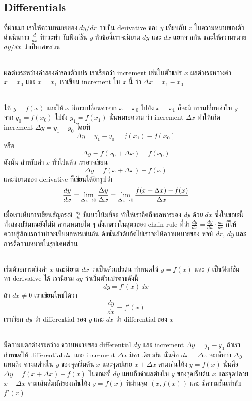 \documentclass[
]{book}
\theoremstyle{definition}
\theoremstyle{definition}
\theoremstyle{definition}
\theoremstyle{definition}
\theoremstyle{remark}
\begin{document}
\subsection{Differentials}\label{differentials}

ที่ผ่านมา เราให้ความหมายของ \(dy/dx\) ว่าเป็น derivative ของ \(y\) เทียบกับ \(x\)
ในความหมายของตัวดำเนินการ \(\frac{d}{dx}\) ที่กระทำ กับฟังก์ชัน \(y\) หัวข้อนี้เราจะนิยาม
\(dy\) และ \(dx\) แยกจากกัน และให้ความหมาย \(dy/dx\) ว่าเป็นเศษส่วน\\
\strut \\
ผลต่างระหว่างค่าสองค่าของตัวแปร เราเรียกว่า increment เช่นในตัวแปร \(x\)
ผลต่างระหว่างค่า \(x=x_0\) และ \(x=x_1\) เราเขียน increment ใน \(x\) นี้ ว่า
\(\Delta x = x_1-x_0\)\\
\strut \\
ให้ \(y=f(x)\) และให้ \(x\) มีการเปลี่ยนค่าจาก \(x=x_0\) ไปยัง \(x=x_1\) ก็จะมี
การเปลี่ยนค่าใน \(y\) จาก \(y_0 = f(x_0)\) ไปยัง \(y_1= f(x_1)\) นั่นหมายความ ว่า
increment \(\Delta x\) ทำให้เกิด increment \(\Delta y = y_1-y_0\) โดยที่
\[\Delta y = y_1-y_0 = f(x_1) - f(x_0)\] หรือ
\[\Delta y = f(x_0+\Delta x) - f(x_0)\] ดังนั้น สำหรับค่า \(x\) ทั่วไปแล้ว
เราอาจเขียน \[\Delta y = f(x+ \Delta x) - f(x)\] และนิยามของ derivative
ก็เขียนได้อีกรูปว่า
\[\frac{dy}{dx} = \lim_{\Delta x \to 0} \frac{\Delta y}{\Delta x} \\
    = \lim_{\Delta x \to 0} \frac{f(x+\Delta x) - f(x)}{\Delta x}\]

เมื่อเราเห็นการเขียนสัญกรณ์ \(\displaystyle \frac{dy}{dx}\) มีแนวโน้มที่จะ
ทำให้เราคิดถึงผลหารของ \(dy\) ด้วย \(dx\) ซึ่งในขณะนี้ ทั้งสองปริมาณยังไม่มี ความหมายใด ๆ
สังเกตว่าในสูตรของ chain rule ที่ว่า
\(\displaystyle \frac{dy}{dx} = \frac{dy}{du} \cdot \frac{du}{dx}\) ก็ให้
ความรู้สึกแรกว่าน่าจะเป็นผลหารเช่นกัน ดังนั้นลำดับถัดไปเราจะให้ความหมายของ พจน์ \(dx\),
\(dy\) และการตีความหมายในรูปเศษส่วน\\
\strut \\
เริ่มด้วยการตรึงค่า \(x\) และนิยาม \(dx\) ว่าเป็นตัวแปรต้น กำหนดให้ \(y = f(x)\) และ \(f\)
เป็นฟังก์ชัน หา derivative ได้ เรานิยาม \(dy\) ว่าเป็นตัวแปรตามดังนี้ \[\boxed{
    dy = f'(x)\,dx
}\] ถ้า \(dx \ne 0\) เราเขียนใหม่ได้ว่า \[\frac{dy}{dx} = f'(x)\] เราเรียก \(dy\)
ว่า differential ของ \(y\) และ \(dx\) ว่า differential ของ \(x\)\\
\strut \\
มีความแตกต่างระหว่าง ความหมายของ differential \(dy\) และ increment
\(\Delta y = y_1-y_0\) ถ้าเรากำหนดให้ differential \(dx\) และ increment
\(\Delta x\) มีค่า เดียวกัน นั่นคือ \(dx = \Delta x\) จะเห็นว่า \(\Delta y\) แทนถึง
ค่าผลต่างใน \(y\) ของจุดเริ่มต้น \(x\) และจุดปลาย \(x+\Delta x\) ตามเส้นโค้ง \(y = f(x)\)
นั่นคือ \(\Delta y = f(x+\Delta x) - f(x)\) ในขณะที่ \(dy\) แทนถึงค่าผลต่างใน \(y\)
ของจุดเริ่มต้น \(x\) และจุดปลาย \(x+\Delta
x\) ตามเส้นสัมผัสของเส้นโค้ง \(y=f(x)\) ที่ผ่านจุด \((x,f(x))\) และ มีความชันเท่ากับ
\(f'(x)\)
\end{document}
